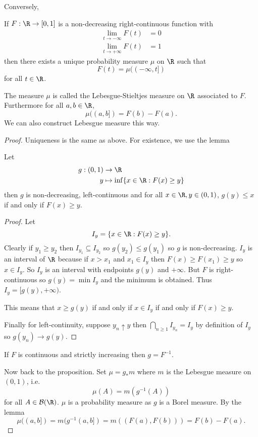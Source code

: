 \documentclass[a4paper]{article}
\begin{document}
Conversely,
\begin{proposition}
  If \(F: \R \to [0, 1]\) is a non-decreasing right-continuous function with
  \begin{align*}
    \lim_{t \to -\infty} F(t) &= 0 \\
    \lim_{t \to +\infty} F(t) &= 1
  \end{align*}
  then there exists a unique probability measure \(\mu\) on \(\R\) such that
  \[
    F(t) = \mu((-\infty, t])
  \]
  for all \(t \in \R\).
\end{proposition}

\begin{remark}
  The measure \(\mu\) is called the Lebesgue-Stieltjes measure on \(\R\) associated to \(F\). Furthermore for all \(a, b \in \R\),
  \[
    \mu((a, b]) = F(b) - F(a).
  \]
  We can also construct Lebesgue measure this way.
\end{remark}

\begin{proof}
  Uniqueness is the same as above. For existence, we use the lemma
  \begin{lemma}
    Let
    \begin{align*}
      g: (0, 1) &\to \R \\
      y &\mapsto \inf \{x \in \R: F(x) \geq y\}
    \end{align*}
    then \(g\) is non-decreasing, left-continuous and for all \(x \in \R, y \in (0, 1)\), \(g(y) \leq x\) if and only if \(F(x) \geq y\).
  \end{lemma}

  \begin{proof}
    Let
    \[
      I_y = \{x \in \R: F(x) \geq y\}.
    \]
    Clearly if \(y_1 \geq y_2\) then \(I_{y_1} \subseteq I_{y_2}\) so \(g(y_2) \leq g(y_1)\) so \(g\) is non-decreasing. \(I_y\) is an interval of \(\R\) because if \(x > x_1\) and \(x_1 \in I_y\) then \(F(x) \geq F(x_1) \geq y\) so \(x \in I_y\). So \(I_y\) is an interval with endpoints \(g(y)\) and \(+ \infty\). But \(F\) is right-continuous so \(g(y) = \min I_y\) and the minimum is obtained. Thus \(I_y = [g(y), + \infty)\).

    This means that \(x \geq g(y)\) if and only if \(x \in I_y\) if and only if \(F(x) \geq y\).

    Finally for left-continuity, suppose \(y_n \uparrow y\) then \(\bigcap_{n \geq 1} I_{y_n} = I_y\) by definition of \(I_y\) so \(g(y_n) \to g(y)\).
  \end{proof}
  \begin{remark}
    If \(F\) is continuous and strictly increasing then \(g = F^{-1}\).
  \end{remark}

  Now back to the proposition. Set \(\mu = g_* m\) where \(m\) is the Lebesgue measure on \((0, 1)\), i.e.
  \[
    \mu(A) = m(g^{-1}(A))
  \]
  for all \(A \in \mathcal B(\R)\). \(\mu\) is a probability measure as \(g\) is a Borel measure. By the lemma
  \[
    \mu((a, b]) = m(g^{-1}(a, b]) = m((F(a), F(b))) = F(b) - F(a).
  \]
\end{proof}
\end{document}
